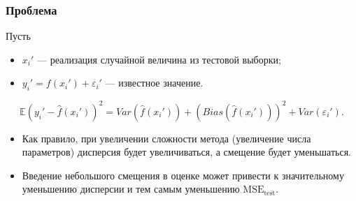 \documentclass[unicode, notheorems]{beamer}
\newcommand{\E}{\mathbb{E}}
\begin{document}
\begin{frame}
\frametitle{Проблема}


Пусть
\begin{itemize}
\item $x_i'$ --- реализация случайной величина из тестовой выборки;
\item $y_i' = f(x_i') + \varepsilon_i'$ --- известное значение.
\end{itemize}

\[\E(y_i' - \hat{f}(x_i'))^2 = Var(\hat{f}(x_i')) + (Bias(\hat{f}(x_i')))^2 + Var(\varepsilon_i').\]

\vspace{0.8cm}
\begin{itemize}
\item Как правило, при увеличении сложности метода (увеличение числа параметров) дисперсия будет увеличиваться, а смещение будет уменьшаться.
\item Введение небольшого смещения в оценке может привести к значительному уменьшению дисперсии и тем самым уменьшению $\mathrm{MSE}_{\mathrm{test}}$.  
\end{itemize}


\end{frame}


%
%
%
%
%
\end{document}
